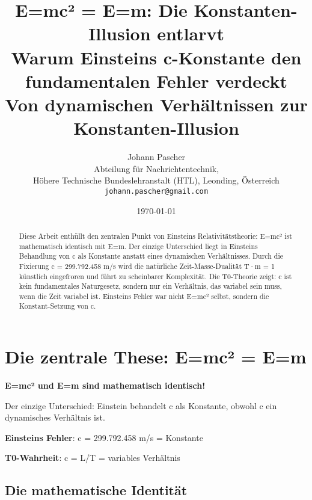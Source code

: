 \documentclass[12pt,a4paper]{article}
\begin{document}
	
	\title{E=mc² = E=m: Die Konstanten-Illusion entlarvt \\
		Warum Einsteins c-Konstante den fundamentalen Fehler verdeckt \\
		\large Von dynamischen Verhältnissen zur Konstanten-Illusion}
	\author{Johann Pascher\\
		Abteilung für Nachrichtentechnik, \\Höhere Technische Bundeslehranstalt (HTL), Leonding, Österreich\\
		\texttt{johann.pascher@gmail.com}}
	\date{\today}
	
	\maketitle
	
	\begin{abstract}
		Diese Arbeit enthüllt den zentralen Punkt von Einsteins Relativitätstheorie: E=mc² ist mathematisch identisch mit E=m. Der einzige Unterschied liegt in Einsteins Behandlung von c als Konstante anstatt eines dynamischen Verhältnisses. Durch die Fixierung c = 299.792.458 m/s wird die natürliche Zeit-Masse-Dualität T·m = 1 künstlich eingefroren und führt zu scheinbarer Komplexität. Die T0-Theorie zeigt: c ist kein fundamentales Naturgesetz, sondern nur ein Verhältnis, das variabel sein muss, wenn die Zeit variabel ist. Einsteins Fehler war nicht E=mc² selbst, sondern die Konstant-Setzung von c.
	\end{abstract}
	
	\tableofcontents
	\newpage
	
	\section{Die zentrale These: E=mc² = E=m}
	
	\begin{tcolorbox}[colback=red!5!white,colframe=red!75!black,title=Die fundamentale Erkenntnis]
		\textbf{E=mc² und E=m sind mathematisch identisch!}
		
		Der einzige Unterschied: Einstein behandelt c als Konstante, obwohl c ein dynamisches Verhältnis ist.
		
		\textbf{Einsteins Fehler}: c = 299.792.458 m/s = Konstante
		
		\textbf{T0-Wahrheit}: c = L/T = variables Verhältnis
	\end{tcolorbox}
	
	\subsection{Die mathematische Identität}
	
\end{document}
